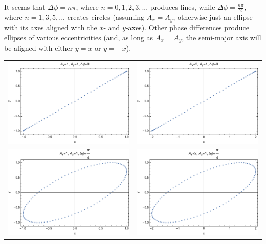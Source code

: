 \documentclass{article}
\begin{document}
It seems that $\Delta\phi = n\pi$, where $n=0,1,2,3,...$ produces lines, while $\Delta\phi=\frac{n\pi}{2}$, where $n=1,3,5,...$ creates circles (assuming $A_x=A_y$, otherwise just an ellipse with its axes aligned with the $x$- and $y$-axes). Other phase differences produce ellipses of various eccentricities (and, as long as $A_x=A_y$, the semi-major axis will be aligned with either $y=x$ or $y=-x$).

\begin{tabular}{ll}
    \includegraphics[width=3in]{homework1/plot_1,1,0.pdf} & \includegraphics[width=3in]{homework1/plot_2,1,0.pdf} \\
    \includegraphics[width=3in]{homework1/plot_1,1,pi4.pdf} & \includegraphics[width=3in]{homework1/plot_2,1,pi4.pdf} \\

\end{tabular}
\end{document}
